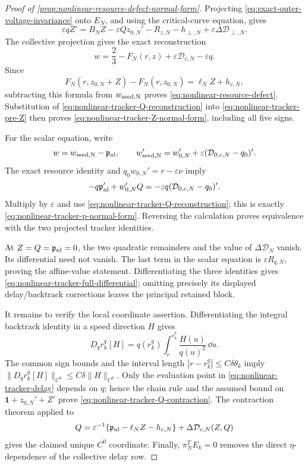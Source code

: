 \begin{proof}[Proof of
\cref{prop:nonlinear-resource-defect-normal-form}]
Projecting \cref{eq:exact-outer-voltage-invariance} onto \(E_N\), and using
the critical-curve equation, gives
\begin{equation}
 \varepsilon qZ'
 =B_NZ-\varepsilon Qz_{0,N}'-R_{z,N}
       -h_{\perp,N}+\varepsilon\Delta\mathcal D_{\perp,N}.
                                                               \label{eq:nonlinear-tracker-pre-Z}
\end{equation}
The collective projection gives the exact reconstruction
\[
 w=\frac23-F_N(r,z)+\varepsilon\mathcal D_{c,N}
       -\varepsilon q.
\]
Since
\[
 F_N(r,z_{0,N}+Z)-F_N(r,z_{0,N})
 =\ell_NZ+h_{c,N},
\]
subtracting this formula from \(w_{\rm seed,N}\) proves
\cref{eq:nonlinear-resource-defect}.  Substitution of
\cref{eq:nonlinear-tracker-Q-reconstruction} into
\cref{eq:nonlinear-tracker-pre-Z} then proves
\cref{eq:nonlinear-tracker-Z-normal-form}, including all five signs.

For the scalar equation, write
\[
 w=w_{\rm seed,N}-\mathfrak p_{\rm nl},\qquad
 w_{\rm seed,N}'
 =w_{0,N}'+\varepsilon(\mathcal D_{0,c,N}-q_0)'.
\]
The exact resource identity and \(q_0w_{0,N}'=r-\varepsilon\nu\) imply
\[
 -q\mathfrak p_{\rm nl}'+w_{0,N}'Q
 =-\varepsilon q(\mathcal D_{0,c,N}-q_0)'.
\]
Multiply by \(\varepsilon\) and use
\cref{eq:nonlinear-tracker-Q-reconstruction}; this is exactly
\cref{eq:nonlinear-tracker-p-normal-form}.  Reversing the calculation proves
equivalence with the two projected tracker identities.

At \(Z=Q=\mathfrak p_{\rm nl}=0\), the two quadratic remainders and the
value of \(\Delta\mathcal D_N\) vanish.  Its differential need not vanish.
The last term in the scalar equation is \(\varepsilon R_{q,N}\), proving
the affine-value statement.  Differentiating the three identities gives
\cref{eq:nonlinear-tracker-full-differential}; omitting precisely its
displayed delay/backtrack corrections leaves the principal retained block.

It remains to verify the local coordinate assertion.  Differentiating the
integral backtrack identity in a speed direction \(H\) gives
\[
 D_qr_k^q[H]
 =q(r_k^q)\int_r^{r_k^q}\frac{H(u)}{q(u)^2}\,\dd u.
\]
The common sign bounds and the interval length
\(|r-r_k^q|\le C\delta\theta_k\) imply
\(\|D_qr_k^q[H]\|_{C^0}\le C\delta\|H\|_{C^0}\).
Only the evaluation point in
\cref{eq:nonlinear-tracker-delay} depends on \(q\); hence the chain rule and
the assumed bound on \(\mathbf1+z_{0,N}'+Z'\) prove
\cref{eq:nonlinear-tracker-Q-contraction}.  The contraction theorem applied
to
\[
 Q=\varepsilon^{-1}
   \{\mathfrak p_{\rm nl}-\ell_NZ-h_{c,N}\}
       +\Delta\mathcal D_{c,N}(Z,Q)
\]
gives the claimed unique \(C^0\) coordinate.  Finally,
\(\pi_N^TE_k=0\) removes the direct \(\eta\)-dependence of the collective
delay row.
\end{proof}

